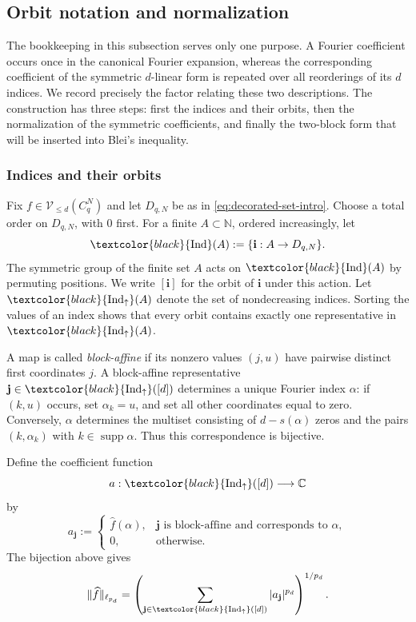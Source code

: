 \documentclass[11pt,a4paper]{article}
\numberwithin{equation}{section}
\theoremstyle{cleanplain}
\theoremstyle{cleandefinition}
\theoremstyle{cleanremark}
\newcommand{\C}{\mathbb C}
\newcommand{\N}{\mathbb N}
\newcommand{\supp}{\operatorname{supp}}
\newcommand{\Ind}{\textcolor{black}{\operatorname{Ind}}}
\newcommand{\Indup}{\textcolor{black}{\operatorname{Ind}_{\uparrow}}}
\begin{document}
{\color{black}
\subsection{Orbit notation and normalization}\label{sec:orbits}

The bookkeeping in this subsection serves only one purpose.  A Fourier
coefficient occurs once in the canonical Fourier expansion, whereas the
corresponding coefficient of the symmetric $d$-linear form is repeated over
all reorderings of its $d$ indices.  We record precisely the factor relating
these two descriptions.  The construction has three steps: first the indices
and their orbits, then the normalization of the symmetric coefficients, and
finally the two-block form that will be inserted into Blei's inequality.

\subsubsection{Indices and their orbits}

{Fix $f\in\mathcal V_{\leq d}(C_q^N)$ and let $D_{q,N}$ be as in}
\eqref{eq:decorated-set-intro}.  {Choose a total order on $D_{q,N}$,
with $0$ first.  For a finite $A\subset\N$, ordered increasingly, let}
\[
 \Ind(A):=\{\mathbf i:A\to D_{q,N}\}.
\]
{The symmetric group of the finite set $A$ acts on $\Ind(A)$ by
permuting positions.  We write $[\mathbf i]$ for the orbit of $\mathbf i$
under this action.  Let $\Indup(A)$ denote the set of nondecreasing indices.
Sorting the values of an index shows that every orbit contains exactly one
representative in $\Indup(A)$.}

A map is called \emph{block-affine} if its nonzero values
$(j,u)$ have pairwise distinct first coordinates $j$.  A block-affine
representative $\mathbf j\in\Indup([d])$ determines a unique Fourier
index $\alpha$: if $(k,u)$ occurs, set $\alpha_k=u$, and set all other
coordinates equal to zero.  Conversely, $\alpha$ determines the multiset
consisting of $d-s(\alpha)$ zeros and the pairs $(k,\alpha_k)$ with
$k\in\supp\alpha$.  Thus this correspondence is bijective.

Define the coefficient function
\[
 a:\Indup([d])\longrightarrow\C
\]
by
\begin{equation}\label{eq:canonical-a}
 a_{\mathbf j}:=
 \begin{cases}
  \widehat f(\alpha),&\mathbf j\text{ is block-affine and corresponds to }\alpha,\\
  0,&\text{otherwise}.
 \end{cases}
\end{equation}
The bijection above gives
\begin{equation}\label{eq:canonical-norm}
 \|\widehat f\|_{\ell_{p_d}}
 =\left(\sum_{\mathbf j\in\Indup([d])}
 |a_{\mathbf j}|^{p_d}\right)^{1/p_d}.
\end{equation}

}
\end{document}
